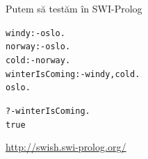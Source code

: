 \documentclass[xcolor=x11names,compress,10pt]{beamer}
\begin{document}
\begin{frame}{Putem să testăm în SWI-Prolog}
\begin{alltt}
windy :- oslo. \\
norway :- oslo. \\
cold :- norway. \\
winterIsComing :- windy, cold. \\
oslo. \\
\end{alltt}

\bigskip
{}
\begin{alltt}
?- winterIsComing.\\
true
\end{alltt}

\bigskip
\underline{\url{http://swish.swi-prolog.org/}}
\end{frame}
\end{document}
